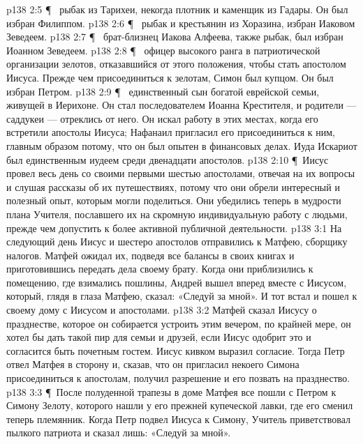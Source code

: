 \vs p138 2:5 \P\ \bibnobreakspace {} рыбак из Тарихеи, некогда плотник и каменщик из Гадары. Он был избран Филиппом.
\vs p138 2:6 \P\ \bibnobreakspace {} рыбак и крестьянин из Хоразина, избран Иаковом Зеведеем.
\vs p138 2:7 \P\ \bibnobreakspace {} брат\hyp{}близнец Иакова Алфеева, также рыбак, был избран Иоанном Зеведеем.
\vs p138 2:8 \P\ \bibnobreakspace {} офицер высокого ранга в патриотической организации зелотов, отказавшийся от этого положения, чтобы стать апостолом Иисуса. Прежде чем присоединиться к зелотам, Симон был купцом. Он был избран Петром.
\vs p138 2:9 \P\ \bibnobreakspace {} единственный сын богатой еврейской семьи, живущей в Иерихоне. Он стал последователем Иоанна Крестителя, и родители --- саддукеи --- отреклись от него. Он искал работу в этих местах, когда его встретили апостолы Иисуса; Нафанаил пригласил его присоединиться к ним, главным образом потому, что он был опытен в финансовых делах. Иуда Искариот был единственным иудеем среди двенадцати апостолов.
\vs p138 2:10 \P\ Иисус провел весь день со своими первыми шестью апостолами, отвечая на их вопросы и слушая рассказы об их путешествиях, потому что они обрели интересный и полезный опыт, которым могли поделиться. Они убедились теперь в мудрости плана Учителя, пославшего их на скромную индивидуальную работу с людьми, прежде чем допустить к более активной публичной деятельности.
\vs p138 3:1 На следующий день Иисус и шестеро апостолов отправились к Матфею, сборщику налогов. Матфей ожидал их, подведя все балансы в своих книгах и приготовившись передать дела своему брату. Когда они приблизились к помещению, где взимались пошлины, Андрей вышел вперед вместе с Иисусом, который, глядя в глаза Матфею, сказал: «Следуй за мной». И тот встал и пошел к своему дому с Иисусом и апостолами.
\vs p138 3:2 Матфей сказал Иисусу о празднестве, которое он собирается устроить этим вечером, по крайней мере, он хотел бы дать такой пир для семьи и друзей, если Иисус одобрит это и согласится быть почетным гостем. Иисус кивком выразил согласие. Тогда Петр отвел Матфея в сторону и, сказав, что он пригласил некоего Симона присоединиться к апостолам, получил разрешение и его позвать на празднество.
\vs p138 3:3 \P\ После полуденной трапезы в доме Матфея все пошли с Петром к Симону Зелоту, которого нашли у его прежней купеческой лавки, где его сменил теперь племянник. Когда Петр подвел Иисуса к Симону, Учитель приветствовал пылкого патриота и сказал лишь: «Следуй за мной».
